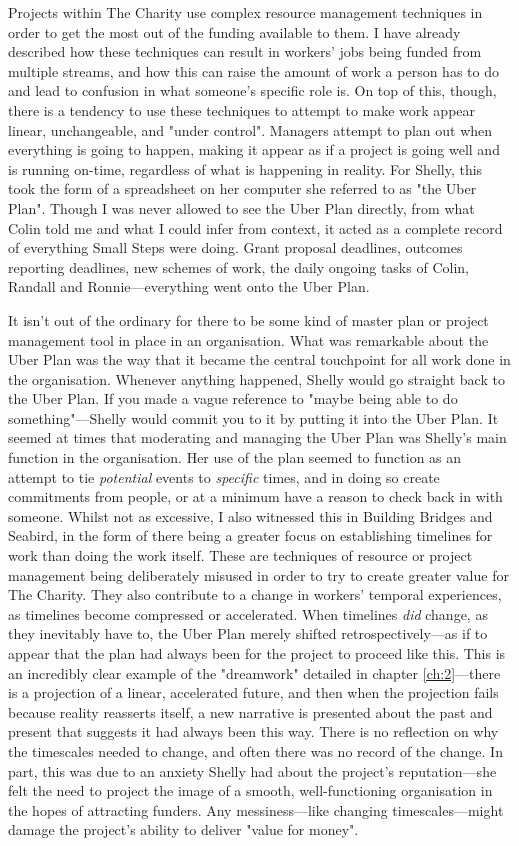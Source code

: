 Projects within The Charity use complex resource management techniques in order to get the most out of the funding available to them. I have already described how these techniques can result in workers’ jobs being funded from multiple streams, and how this can raise the amount of work a person has to do and lead to confusion in what someone’s specific role is. On top of this, though, there is a tendency to use these techniques to attempt to make work appear  linear, unchangeable, and "under control". Managers attempt to plan out when everything is going to happen, making it appear as if a project is going well and is running on-time, regardless of what is happening in reality. For Shelly, this took the form of a spreadsheet on her computer she referred to as "the Uber Plan". Though I was never allowed to see the Uber Plan directly, from what Colin told me and what I could infer from context, it acted as a complete record of everything Small Steps were doing. Grant proposal deadlines, outcomes reporting deadlines, new schemes of work, the daily ongoing tasks of Colin, Randall and Ronnie—everything went onto the Uber Plan. 

It isn’t out of the ordinary for there to be some kind of master plan or project management tool in place in an organisation. What was remarkable about the Uber Plan was the way that it became the central touchpoint for all work done in the organisation. Whenever anything happened, Shelly would go straight back to the Uber Plan. If you made a vague reference to "maybe being able to do something"—Shelly would commit you to it by putting it into the Uber Plan. It seemed at times that moderating and managing the Uber Plan was Shelly’s main function in the organisation. Her use of the plan seemed to function as an attempt to tie \textit{potential} events to \textit{specific} times, and in doing so create commitments from people, or at a minimum have a reason to check back in with someone. Whilst not as excessive, I also witnessed this in Building Bridges and Seabird, in the form of there being a greater focus on establishing timelines for work than doing the work itself. These are techniques of resource or project management being deliberately misused in order to try to create greater value for The Charity. They also contribute to a change in workers' temporal experiences, as timelines become compressed or accelerated. When timelines \emph{did} change, as they inevitably have to, the Uber Plan merely shifted retrospectively—as if to appear that the plan had always been for the project to proceed like this. This is an incredibly clear example of the "dreamwork" detailed in chapter \ref{ch:2}—there is a projection of a linear, accelerated future, and then when the projection fails because reality reasserts itself, a new narrative is presented about the past and present that suggests it had always been this way. There is no reflection on why the timescales needed to change, and often there was no record of the change. In part, this was due to an anxiety Shelly had about the project's reputation—she felt the need to project the image of a smooth, well-functioning organisation in the hopes of attracting funders. Any messiness—like changing timescales—might damage the project's ability to deliver "value for money". 

